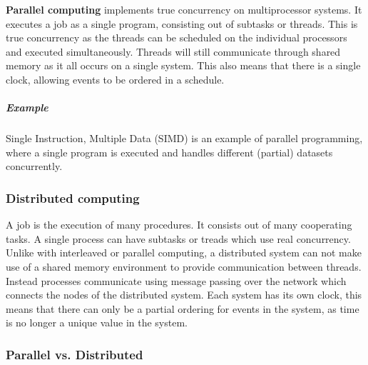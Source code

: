 \documentclass[a4paper]{article}
\begin{document}
\textbf{Parallel computing} implements true concurrency on multiprocessor systems. It executes a job as a single program, consisting out of subtasks or threads. This is true concurrency as the threads can be scheduled on the individual processors and executed simultaneously. Threads will still communicate through shared memory as it all occurs on a single system. This also means that there is a single clock, allowing events to be ordered in a schedule.

\subparagraph{Example} Single Instruction, Multiple Data (SIMD) is an example of parallel programming, where a single program is executed and handles different (partial) datasets concurrently.

\subsubsection{Distributed computing}

A job is the execution of many procedures. It consists out of many cooperating tasks. A single process can have subtasks or treads which use real concurrency. Unlike with interleaved or parallel computing, a distributed system can not make use of a shared memory environment to provide communication between threads. Instead processes communicate using message passing over the network which connects the nodes of the distributed system. Each system has its own clock, this means that there can only be a partial ordering for events in the system, as time is no longer a unique value in the system.

\subsubsection{Parallel vs. Distributed}
\end{document}

